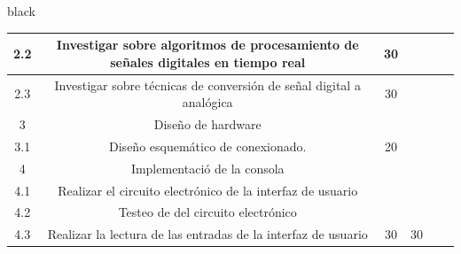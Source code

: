 \documentclass[11pt]{charter}
\begin{document}
\begin{consigna}{black}
\begin{table}[]
\begin{tabular}{|c|c|c|c|c|c|}
2.2                                                                                            & Investigar sobre algoritmos de procesamiento de señales digitales en tiempo real   & 30 &              &              &                                                                     \\ \hline
2.3                                                                                            & Investigar sobre técnicas de conversión de señal digital a analógica               & 30 &              &              &                                                                     \\ \hline
\rowcolor[HTML]{CBCEFB} 
3                                                                                              & Diseño de hardware                                                                 &    &              &              &                                                                     \\ \hline
3.1                                                                                            & Diseño esquemático de conexionado.                                                 & 20 &              &              &                                                                     \\ \hline
\rowcolor[HTML]{CBCEFB} 
4                                                                                              & Implementació de la consola                                                        &    &              &              &                                                                     \\ \hline
4.1                                                                                            & Realizar el circuito electrónico de la interfaz de usuario                         &    &              &              &                                                                     \\ \hline
4.2                                                                                            & Testeo de del circuito electrónico                                                 &    &              &              &                                                                     \\ \hline
4.3                                                                                            & Realizar la lectura de las entradas de la interfaz de usuario                      & 30 & 30           &              &                                                                     \\ \hline

\end{tabular}
\end{table}
\end{consigna}
\end{document}

